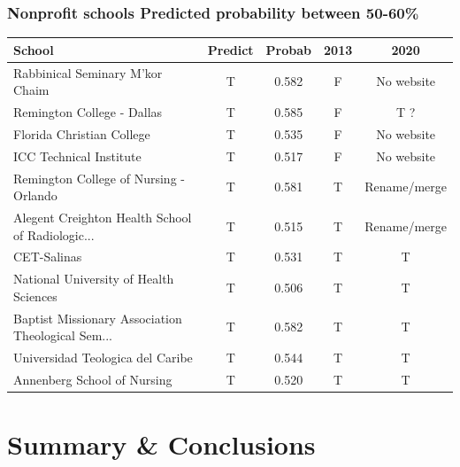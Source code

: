 \documentclass{beamer}
\begin{document}
\begin{frame} 
\frametitle{Nonprofit schools \newline 
Predicted probability between 50-60\%}

\begin{footnotesize}
\begin{table}
\begin{tabularx}{4.5in}{L c c c c}

School & Predict & Probab & 2013 & 2020 \\ \hline
Rabbinical Seminary M'kor Chaim & T & 0.582 & F & No website \\ 
Remington College - Dallas & T & 0.585 & F & T ?\\
Florida Christian College & T & 0.535 & F & No website \\ 
ICC Technical Institute & T & 0.517 & F & No website\\ 
Remington College of Nursing - Orlando & T &  0.581  & T & Rename/merge \\
Alegent Creighton Health School of Radiologic... & T & 0.515 & T & Rename/merge \\
CET-Salinas & T & 0.531 & T & T \\
National University of Health Sciences & T & 0.506  & T & T \\
Baptist Missionary Association Theological Sem... & T &  0.582 & T & T \\
Universidad Teologica del Caribe & T &  0.544 & T & T \\
Annenberg School of Nursing & T & 0.520  & T & T \\

\end{tabularx}
\end{table}
\end{footnotesize}

\end{frame}

\section{Summary \& Conclusions} %
\end{document}
